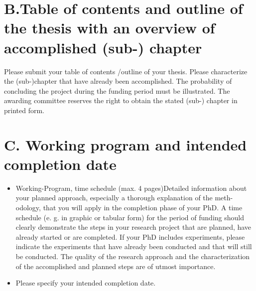 \documentclass[11pt, notitlepage]{article} %
\begin{document}

\spa
\section*{B.Table of contents and outline of the thesis with an overview of accomplished (sub-) chapter}
Please submit your table of contents /outline of your thesis. Please characterize the (sub-)chapter 
that have already been accomplished. 
The probability of concluding the project during the funding period must be illustrated. 
The awarding committee reserves the right to obtain the stated (sub-) chapter in printed form.


\newpage
\section*{C. Working program and intended completion date}
\begin{itemize}
    \item Working-Program, time schedule (max. 4 pages)Detailed information about your planned approach, especially a thorough explanation of the meth-odology, 
	that you will apply in the completion phase of your  PhD. A time schedule (e. g. in graphic or  tabular  form)  for  the  period  of  
	funding  should  clearly  demonstrate  the  steps  in  your  research  project that are planned, have already started or are completed. 
	If your PhD includes experiments, please indicate the experiments that have already been conducted and that will still be conducted. 
	The  quality  of  the  research  approach  and  the  characterization  of  the  accomplished  and  planned  steps are of utmost importance.
    \item Please specify your intended completion date.
\end{itemize}
\end{document}
